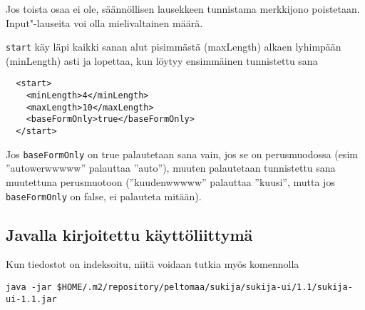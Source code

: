 \documentclass[12pt,a4paper]{scrartcl}
\begin{document}
Jos toista osaa ei ole, säännöllisen lausekkeen tunnistama merkkijono
poistetaan. Input"-lauseita voi olla mielivaltainen määrä.




\bigskip
\verb=start= käy läpi kaikki sanan alut pisimmästä (maxLength) alkaen
lyhimpään (minLength) asti ja lopettaa, kun löytyy ensimmäinen
tunnistettu sana

\begin{verbatim}
  <start>
    <minLength>4</minLength>
    <maxLength>10</maxLength>
    <baseFormOnly>true</baseFormOnly>
  </start>
\end{verbatim}

Jos \verb=baseFormOnly= on true palautetaan sana vain, jos se on
perusmuodossa (esim ''autowerwwwww'' palauttaa ''auto''), muuten
palautetaan tunnistettu sana muutettuna perusmuotoon (''kuudenwwwww''
palauttaa ''kuusi'', mutta jos \verb=baseFormOnly= on false, ei
palauteta mitään).


\subsection*{Javalla kirjoitettu käyttöliittymä}

Kun tiedostot on indeksoitu, niitä voidaan tutkia myös komennolla

\verb|java -jar $HOME/.m2/repository/peltomaa/sukija/sukija-ui/1.1/sukija-ui-1.1.jar|
\end{document}
